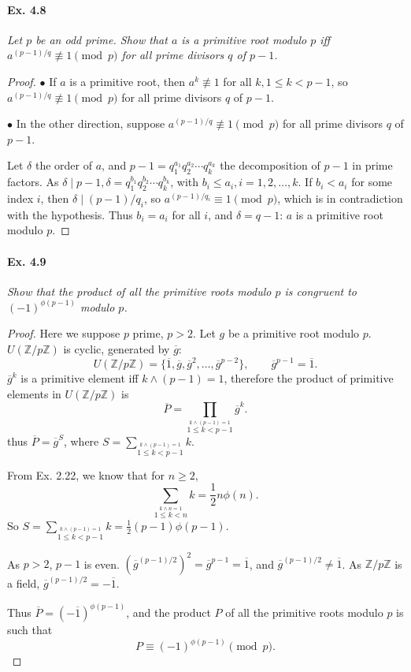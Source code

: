 \documentclass[11pt,a4paper]{article}
\newcommand{\Z}{\mathbb{Z}}
\begin{document}
\paragraph{Ex. 4.8}

{\it  Let $p$ be an odd prime. Show that $a$ is a primitive root modulo $p$ iff $a^{(p-1)/q} \not \equiv 1 \pmod p$ for all prime divisors $q$ of $p - 1$.
}

\begin{proof}
$\bullet$ If $a$ is a primitive root, then $a^k \not \equiv 1$ for all $k, 1\leq k < p-1$, so $a^{(p-1)/q} \not \equiv 1 \pmod p$ for all prime divisors $q$ of $p - 1$.

$\bullet$ In the other direction, suppose $a^{(p-1)/q} \not \equiv 1 \pmod p$ for all prime divisors $q$ of $p - 1$.

Let $\delta$ the order of $a$, and $p-1 = q_1^{a_1}q_2^{a_2}\cdots q_k^{a_k}$ the decomposition of $p-1$ in prime factors. As $\delta \mid p-1, \delta = q_1^{b_1}q_2^{b_2}\cdots q_k^{b_k}$, with $b_i \leq a_i, i=1,2,\ldots,k$. If $b_i < a_i$ for some index $i$, then $\delta \mid (p-1)/q_i$, so $a^{(p-1)/q_i} \equiv 1 \pmod p$, which is in contradiction with the hypothesis. Thus $b_i = a_i$ for all $i$, and $\delta = q-1$: $a$ is a primitive root modulo $p$.
\end{proof}

\paragraph{Ex. 4.9}

{\it Show that the product of all the primitive roots modulo $p$ is congruent to $(-1)^{\phi(p-1)}$ modulo $p$.
}

\begin{proof} Here we suppose $p$ prime, $p>2$. Let $g$ be a primitive root modulo $p$. $U(\Z/p\Z)$ is cyclic, generated by $\overline{g}$:
$$U(\Z/p\Z) = \{\overline{1},\overline{g}, \overline{g}^2, \ldots,\overline{g}^{p-2}\},\qquad \overline{g}^{p-1} = \overline{1}.$$
$\overline{g}^k$ is a primitive element iff $k \wedge (p-1) = 1$, therefore the product of primitive elements in $U(\Z/p\Z)$ is
$$\overline{P} = \prod_{\overset{k\wedge (p-1) = 1}{ 1\leq k < p-1}} \overline{g}^k.$$
thus $\overline{P} = \overline{g}^S$, where $S = \sum\limits_{\overset{k\wedge (p-1) = 1}{ 1\leq k < p-1}}  k$.

From Ex. 2.22, we know that for $n\geq 2$,
$$\sum_{\overset{k\wedge n = 1}{ 1\leq k < n}}  k = \frac{1}{2} n \phi(n).$$
So $S = \sum\limits_{\overset{k\wedge (p-1) = 1}{ 1\leq k < p-1}}  k = \frac{1}{2} (p-1) \phi(p-1)$.

As $p>2$, $p-1$ is even. $(\overline{g}^{(p-1)/2})^2 = \overline{g}^{p-1} = \overline{1}$, and $\overline{g}^{(p-1)/2} \ne \overline{1}$. As $\Z/p\Z$ is a field, $\overline{g}^{(p-1)/2} = -\overline{1}$.

Thus $\overline{P} = (-\overline{1})^{\phi(p-1)}$, and the product $P$ of all the primitive roots modulo $p$ is such that
$$P \equiv  (-1)^{\phi(p-1)} \pmod p.$$
\end{proof}
\end{document}
